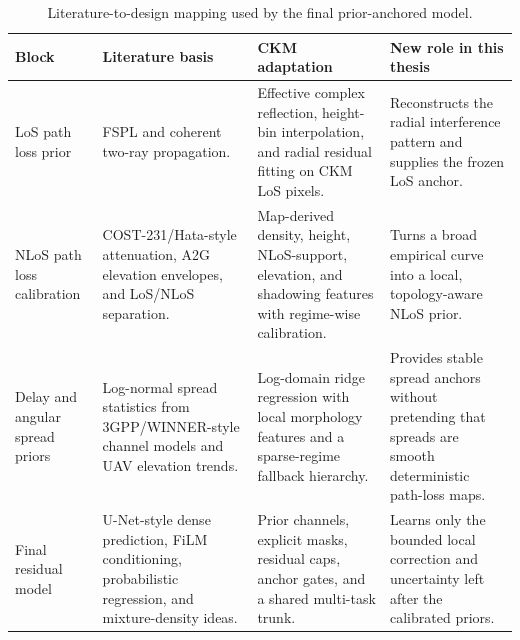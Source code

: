 \begin{table}[H]
\centering
\caption{Literature-to-design mapping used by the final prior-anchored model.}
\label{tab:prior_literature_mapping}
\scriptsize
\renewcommand{\arraystretch}{1.12}
\begin{tabularx}{\textwidth}{>{\raggedright\arraybackslash}p{}
>{\raggedright\arraybackslash}X
>{\raggedright\arraybackslash}X
>{\raggedright\arraybackslash}X}
\toprule
Block & Literature basis & CKM adaptation & New role in this thesis \\
\midrule
LoS path loss prior &
FSPL and coherent two-ray propagation. &
Effective complex reflection, height-bin interpolation, and radial residual
fitting on CKM LoS pixels. &
Reconstructs the radial interference pattern and supplies the frozen LoS
anchor. \\
NLoS path loss calibration &
COST-231/Hata-style attenuation, A2G elevation envelopes, and LoS/NLoS
separation. &
Map-derived density, height, NLoS-support, elevation, and shadowing features
with regime-wise calibration. &
Turns a broad empirical curve into a local, topology-aware NLoS prior. \\
Delay and angular spread priors &
Log-normal spread statistics from 3GPP/WINNER-style channel models and UAV
elevation trends. &
Log-domain ridge regression with local morphology features and a sparse-regime
fallback hierarchy. &
Provides stable spread anchors without pretending that spreads are smooth
deterministic path-loss maps. \\
Final residual model &
U-Net-style dense prediction, FiLM conditioning, probabilistic regression, and
mixture-density ideas. &
Prior channels, explicit masks, residual caps, anchor gates, and a shared
multi-task trunk. &
Learns only the bounded local correction and uncertainty left after the
calibrated priors. \\
\bottomrule
\end{tabularx}
\end{table}
